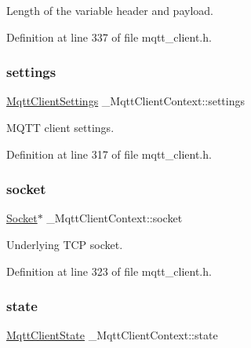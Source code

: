 Length of the variable header and payload. 



Definition at line 337 of file mqtt\+\_\+client.\+h.

\mbox{\label{struct__MqttClientContext_a7f819b9dd7c2adb6e6507d2689cf50ca}} 
\subsubsection{\texorpdfstring{settings}{settings}}
{\footnotesize\ttfamily \hyperlink{structMqttClientSettings}{Mqtt\+Client\+Settings} \+\_\+\+Mqtt\+Client\+Context\+::settings}



M\+Q\+TT client settings. 



Definition at line 317 of file mqtt\+\_\+client.\+h.

\mbox{\label{struct__MqttClientContext_ac49874b370be2e099097631107419cb4}} 
\subsubsection{\texorpdfstring{socket}{socket}}
{\footnotesize\ttfamily \hyperlink{socket_8h_aa85acfb0fa336ef495e6ba87fb88fc48}{Socket}$\ast$ \+\_\+\+Mqtt\+Client\+Context\+::socket}



Underlying T\+CP socket. 



Definition at line 323 of file mqtt\+\_\+client.\+h.

\mbox{\label{struct__MqttClientContext_ab816e3601da7ee580d958845249d8898}} 
\subsubsection{\texorpdfstring{state}{state}}
{\footnotesize\ttfamily \hyperlink{mqtt__client_8h_a4962cf68fc8b67cdc2fdd8d5be59ff00}{Mqtt\+Client\+State} \+\_\+\+Mqtt\+Client\+Context\+::state}



